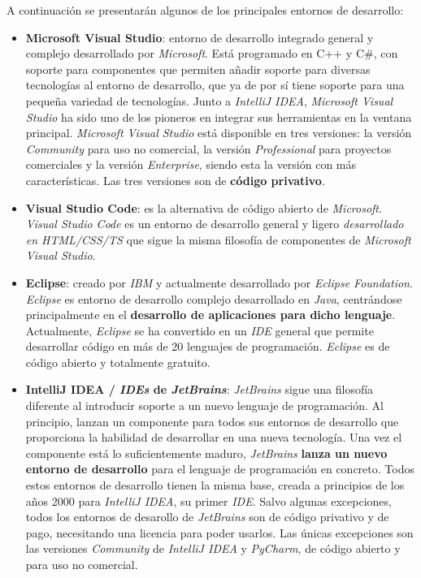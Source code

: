 A continuación se presentarán algunos de los principales
entornos de desarrollo:
\begin{itemize}
    \item \textbf{Microsoft Visual Studio}\cite{VISUALSTUDIO}: entorno de desarrollo
    integrado general y complejo desarrollado por \textit{Microsoft}.
    Está programado en C++ y C\#, con soporte para componentes
    que permiten añadir soporte para diversas tecnologías
    al entorno de desarrollo, que ya de por sí tiene soporte para una pequeña
    variedad de tecnologías.
    Junto a \textit{IntelliJ IDEA}, \textit{Microsoft Visual Studio} ha sido uno
    de los pioneros en integrar sus herramientas en la ventana principal.
    \textit{Microsoft Visual Studio} está disponible en tres versiones: la versión
    \textit{Community} para uso no comercial, la versión \textit{Professional} para
    proyectos comerciales y la versión \textit{Enterprise}, siendo esta la versión
    con más características.
    Las tres versiones son de \textbf{código privativo}.
    \item \textbf{Visual Studio Code}\cite{VISUALSTUDIOCODE}:
    es la alternativa de código abierto de \textit{Microsoft}.
    \textit{Visual Studio Code} es un entorno de desarrollo general
    y ligero \textit{desarrollado en HTML/CSS/TS} que sigue la misma filosofía
    de componentes de \textit{Microsoft Visual Studio}.
    \item \textbf{Eclipse}\cite{ECLIPSE}: creado por \textit{IBM} y actualmente
    desarrollado por \textit{Eclipse Foundation}.
    \textit{Eclipse} es entorno de desarrollo complejo desarrollado en \textit{Java},
    centrándose principalmente en el \textbf{desarrollo de aplicaciones para dicho lenguaje}.
    Actualmente, \textit{Eclipse} se ha convertido en un \textit{IDE} general que
    permite desarrollar código en más de 20 lenguajes de programación.
    \textit{Eclipse} es de código abierto y totalmente gratuito.
    \item \textbf{IntelliJ IDEA / \textit{IDEs} de \textit{JetBrains}}\cite{INTELLIJIDEA}:
    \textit{JetBrains} sigue una filosofía diferente al introducir
    soporte a un nuevo lenguaje de programación.
    Al principio, lanzan un componente para todos sus entornos de desarrollo
    que proporciona la habilidad de desarrollar en una nueva tecnología.
    Una vez el componente está lo suficientemente maduro, \textit{JetBrains}
    \textbf{lanza un nuevo entorno de desarrollo} para el lenguaje de programación
    en concreto.
    Todos estos entornos de desarrollo tienen la misma base, creada a
    principios de los años 2000 para \textit{IntelliJ IDEA}, su primer \textit{IDE}.
    Salvo algunas excepciones, todos los entornos de desarollo de \textit{JetBrains}
    son de código privativo y de pago, necesitando una licencia para poder usarlos.
    Las únicas excepciones son las versiones \textit{Community} de \textit{IntelliJ IDEA}
    y \textit{PyCharm}, de código abierto y para uso no comercial.
\end{itemize}
